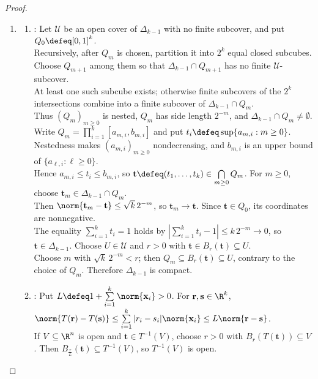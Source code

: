 \begin{proposition}
\begin{proof}
\begin{enumerate}[label=(\roman*)]
Since $S\subseteq C$, $\operatorname{conv}(S)\subseteq C$ by Definition \ref{def:convex-combinations-cones-hulls}(v), and therefore $\operatorname{conv}(S)=C$.
\item
\begin{enumerate}[label=(\alph*)]
\setlength{\itemsep}{0pt}
\item {}: Let $\mathcal{U}$ be an open cover of $\Delta_{k-1}$ with no finite subcover, and put $Q_0\defeq[0,1]^k$.\\
Recursively, after $Q_m$ is chosen, partition it into $2^k$ equal closed subcubes.\\
Choose $Q_{m+1}$ among them so that $\Delta_{k-1}\cap Q_{m+1}$ has no finite $\mathcal{U}$-subcover.\\
At least one such subcube exists; otherwise finite subcovers of the $2^k$ intersections combine into a finite subcover of $\Delta_{k-1}\cap Q_m$.\\
Thus $(Q_m)_{m\geq0}$ is nested, $Q_m$ has side length $2^{-m}$, and $\Delta_{k-1}\cap Q_m\neq\emptyset$.\\
Write $Q_m=\prod\limits_{i=1}^{k}[a_{m,i},b_{m,i}]$ and put $t_i\defeq\sup\{a_{m,i}:m\geq0\}$.\\
Nestedness makes $(a_{m,i})_{m\geq0}$ nondecreasing, and $b_{m,i}$ is an upper bound of $\{a_{\ell,i}:\ell\geq0\}$.\\
Hence $a_{m,i}\leq t_i\leq b_{m,i}$, so $\mathbf{t}\defeq(t_1,\ldots,t_k)\in\bigcap\limits_{m\geq0}Q_m$. For $m\geq0$, choose $\mathbf{t}_m\in\Delta_{k-1}\cap Q_m$.\\
Then $\norm{\mathbf{t}_m-\mathbf{t}}\leq\sqrt{k}\,2^{-m}$, so $\mathbf{t}_m\to\mathbf{t}$. Since $\mathbf{t}\in Q_0$, its coordinates are nonnegative.\\
The equality $\sum\limits_{i=1}^{k}t_i=1$ holds by $\left|\sum\limits_{i=1}^{k}t_i-1\right|\leq k\,2^{-m}\to0$, so $\mathbf{t}\in\Delta_{k-1}$. Choose $U\in\mathcal{U}$ and $r>0$ with $\mathbf{t}\in B_r(\mathbf{t})\subseteq U$.\\
Choose $m$ with $\sqrt{k}\,2^{-m}<r$; then $Q_m\subseteq B_r(\mathbf{t})\subseteq U$, contrary to the choice of $Q_m$. Therefore $\Delta_{k-1}$ is compact.
\item {}: Put $L\defeq1+\sum\limits_{i=1}^{k}\norm{\mathbf{x}_i}>0$. For $\mathbf{r},\mathbf{s}\in\R^k$, $\norm{T(\mathbf{r})-T(\mathbf{s})}\leq\sum\limits_{i=1}^{k}|r_i-s_i|\norm{\mathbf{x}_i}\leq L\norm{\mathbf{r}-\mathbf{s}}$.\\
If $V\subseteq\R^n$ is open and $\mathbf{t}\in T^{-1}(V)$, choose $r>0$ with $B_r(T(\mathbf{t}))\subseteq V$. Then $B_{\frac{r}{L}}(\mathbf{t})\subseteq T^{-1}(V)$, so $T^{-1}(V)$ is open.

\end{enumerate}
\end{enumerate}
\end{proof}
\end{proposition}
